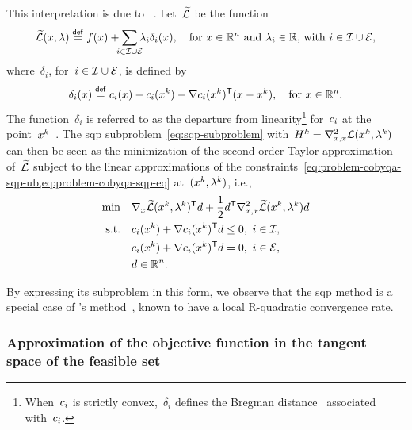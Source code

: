 This interpretation is due to \citeauthor{Robinson_1972a}~\cite[Rem.~4]{Robinson_1972a}.
Let~$\widetilde{\lag}$ be the function
\begin{equation*}
    \widetilde{\lag}(\iter, \lm) \eqdef \obj(\iter) + \sum_{\mathclap{i \in \iub \cup \ieq}} \lm_i \delta_i(\iter), \quad \text{for~$\iter \in \R^n$ and~$\lm_i \in \R$, with~$i \in \iub \cup \ieq$},
\end{equation*}
where~$\delta_i$, for~$i \in \mathcal{I} \cup \mathcal{E}$, is defined by
\begin{equation*}
    \delta_i(\iter) \eqdef \con{i}(\iter) - \con{i}(\iter[k]) - \nabla \con{i}(\iter[k])^{\T} (\iter - \iter[k]), \quad \text{for~$\iter \in \R^n$.}
\end{equation*}
The function~$\delta_i$ is referred to as the departure from linearity\footnote{When~$c_{i}$ is strictly convex,~$\delta_i$ defines the Bregman distance~\cite{Bregman_1967} associated with~$c_{i}$.} for~$c_{i}$ at the point~$\iter[k]$~\cite[\S~2]{Gill_Wong_2011}.
The \gls{sqp} subproblem~\cref{eq:sqp-subproblem} with~$H^k = \nabla_{x, x}^2 \lag(\iter[k], \lm[k])$ can then be seen as the minimization of the second-order Taylor approximation of~$\widetilde{\lag}$ subject to the linear approximations of the constraints~\cref{eq:problem-cobyqa-sqp-ub,eq:problem-cobyqa-sqp-eq} at~$(\iter[k], \lm[k])$, i.e.,
\begin{align*}
    \min        & \quad \nabla_x \widetilde{\lag}(\iter[k], \lm[k])^{\T} \step + \frac{1}{2} \step^{\T} \nabla_{x, x}^2 \widetilde{\lag}(\iter[k], \lm[k]) \step\\
    \text{s.t.} & \quad \con{i}(\iter[k]) + \nabla \con{i}(\iter[k])^{\T} \step \le 0, ~ i \in \iub,\\
                & \quad \con{i}(\iter[k]) + \nabla \con{i}(\iter[k])^{\T} \step = 0, ~ i \in \ieq,\\
                & \quad \step \in \R^n.
\end{align*}

By expressing its subproblem in this form, we observe that the \gls{sqp} method is a special case of \citeauthor{Robinson_1972a}'s method~\cite{Robinson_1972a}, known to have a local R-quadratic convergence rate.

\subsubsection{Approximation of the objective function in the tangent space of the feasible set}

